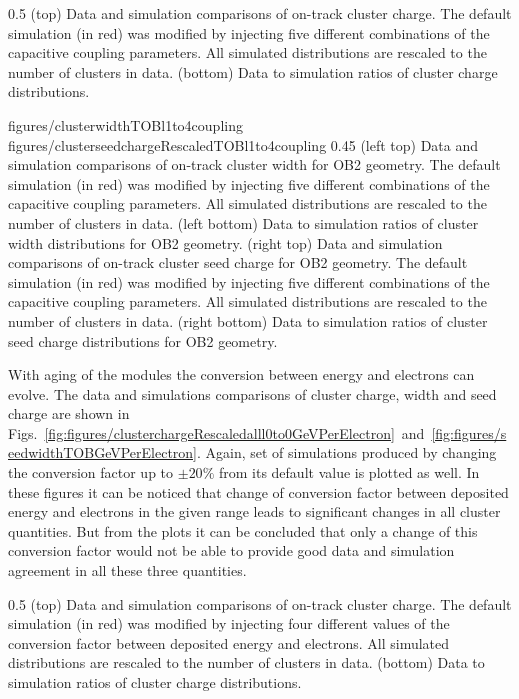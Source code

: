                  {0.5}       %
                 { (top) Data and simulation comparisons of on-track cluster charge. The default simulation (in red) was modified by injecting five different combinations of the capacitive coupling parameters. All simulated distributions are rescaled to the number of clusters in data. (bottom) Data to simulation ratios of cluster charge distributions. }

                 {figures/clusterwidthTOBl1to4coupling}
                 {figures/clusterseedchargeRescaledTOBl1to4coupling} %
                 {0.45}       %
                 {(left top) Data and simulation comparisons of on-track cluster width for OB2 geometry. The default simulation (in red) was modified by injecting five different combinations of the capacitive coupling parameters. All simulated distributions are rescaled to the number of clusters in data. (left bottom) Data to simulation ratios of cluster width distributions for OB2 geometry. (right top) Data and simulation comparisons of on-track cluster seed charge for OB2 geometry. The default simulation (in red) was modified by injecting five different combinations of the capacitive coupling parameters. All simulated distributions are rescaled to the number of clusters in data. (right bottom) Data to simulation ratios of cluster seed charge distributions for OB2 geometry. }

With aging of the modules the conversion between energy and electrons can evolve. The data and simulations comparisons of cluster charge, width and seed charge are shown in Figs.~\ref{fig:figures/clusterchargeRescaledalll0to0GeVPerElectron}~and~\ref{fig:figures/seedwidthTOBGeVPerElectron}. Again, set of simulations produced by changing the conversion factor up to $\pm 20\%$ from its default value is plotted as well. In these figures it can be noticed that change of conversion factor between deposited energy and electrons in the given range leads to significant changes in all cluster quantities. But from the plots it can be concluded that only a change of this conversion factor would not be able to provide good data and simulation agreement in all these three quantities.

                 {0.5}       %
                 { (top) Data and simulation comparisons of on-track cluster charge. The default simulation (in red) was modified by injecting four different values of the conversion factor between deposited energy and electrons. All simulated distributions are rescaled to the number of clusters in data. (bottom) Data to simulation ratios of cluster charge distributions. }

